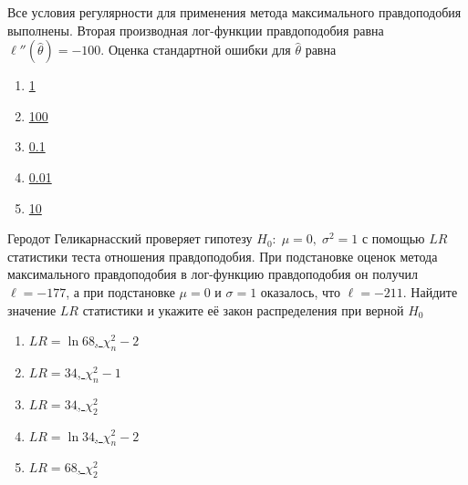 \documentclass[t]{beamer}
\begin{document}
 \begin{frame} \label{49} 
\begin{block}{49} 

Все условия регулярности для применения метода максимального правдоподобия выполнены. Вторая производная лог-функции правдоподобия равна $\ell''(\hat{\theta})=-100$. Оценка стандартной ошибки для $\hat{\theta}$ равна
 


 \end{block} 
\begin{enumerate} 
\item[] \hyperlink{49-No}{\beamergotobutton{} 1}
\item[] \hyperlink{49-No}{\beamergotobutton{} 100}
\item[] \hyperlink{49-Yes}{\beamergotobutton{} 0.1}
\item[] \hyperlink{49-No}{\beamergotobutton{} 0.01}
\item[] \hyperlink{49-No}{\beamergotobutton{} 10}
\end{enumerate} 
\end{frame} 


 \begin{frame} \label{50} 
\begin{block}{50} 

Геродот Геликарнасский проверяет гипотезу $H_0: \; \mu=0, \; \sigma^2=1$ с помощью $LR$ статистики теста отношения правдоподобия. При подстановке оценок метода максимального правдоподобия в лог-функцию правдоподобия он получил $\ell=-177$, а при подстановке $\mu=0$ и $\sigma=1$ оказалось, что $\ell=-211$. Найдите значение $LR$ статистики и укажите её закон распределения при верной $H_0$
 


 \end{block} 
\begin{enumerate} 
\item[] \hyperlink{50-No}{\beamergotobutton{} $LR=\ln 68$, $\chi^2_n-2$}
\item[] \hyperlink{50-No}{\beamergotobutton{} $LR=34$, $\chi^2_n-1$}
\item[] \hyperlink{50-No}{\beamergotobutton{} $LR=34$, $\chi^2_2$}
\item[] \hyperlink{50-No}{\beamergotobutton{} $LR=\ln 34$, $\chi^2_n-2$}
\item[] \hyperlink{50-Yes}{\beamergotobutton{} $LR=68$, $\chi^2_2$}
\end{enumerate} 
\end{frame} 
\end{document}
